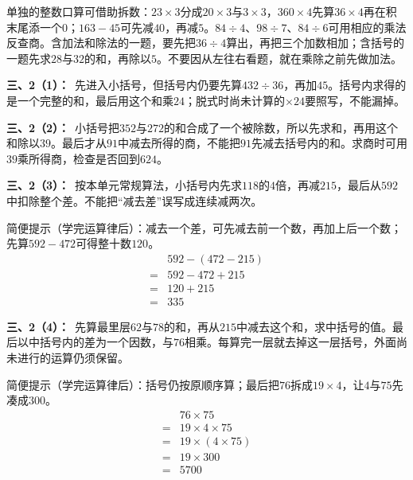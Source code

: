 \documentclass[multi=snippet,border=0pt]{standalone}
\newenvironment{snippet}[3]{\begin{minipage}{#1bp}\color{answerred}\fontsize{#2}{#3}\selectfont\raggedright}{\end{minipage}}
\begin{document}
\begin{snippet}{505}{11.5}{14}单独的整数口算可借助拆数：\(23\times3\)分成\(20\times3\)与\(3\times3\)，\(360\times4\)先算\(36\times4\)再在积末尾添一个\(0\)；\(163-45\)可先减\(40\)，再减\(5\)。\(84\div4\)、\(98\div7\)、\(84\div6\)可用相应的乘法反查商。含加法和除法的一题，要先把\(36\div4\)算出，再把三个加数相加；含括号的一题先求\(28\)与\(32\)的和，再除以\(5\)。不要因从左往右看题，就在乘除之前先做加法。\end{snippet}
\begin{snippet}{505}{11.5}{14}\textbf{三、2（1）：}\ 先进入小括号，但括号内仍要先算\(432\div36\)，再加\(45\)。括号内求得的是一个完整的和，最后用这个和乘\(24\)；脱式时尚未计算的\(\times24\)要照写，不能漏掉。\end{snippet}
\begin{snippet}{505}{11.5}{14}\textbf{三、2（2）：}\ 小括号把\(352\)与\(272\)的和合成了一个被除数，所以先求和，再用这个和除以\(39\)。最后才从\(91\)中减去所得的商，不能把\(91\)先减去括号内的和。求商时可用\(39\)乘所得商，检查是否回到\(624\)。\end{snippet}
\begin{snippet}{505}{11.5}{14}\textbf{三、2（3）：}\ 按本单元常规算法，小括号内先求\(118\)的\(4\)倍，再减\(215\)，最后从\(592\)中扣除整个差。不能把“减去差”误写成连续减两次。\par 简便提示（学完运算律后）：减去一个差，可先减去前一个数，再加上后一个数；先算\(592-472\)可得整十数\(120\)。\[\begin{aligned}&592-(472-215)\\={}&592-472+215\\={}&120+215\\={}&335\end{aligned}\]\end{snippet}
\begin{snippet}{505}{11.5}{14}\textbf{三、2（4）：}\ 先算最里层\(62\)与\(78\)的和，再从\(215\)中减去这个和，求中括号的值。最后以中括号内的差为一个因数，与\(76\)相乘。每算完一层就去掉这一层括号，外面尚未进行的运算仍须保留。\par 简便提示（学完运算律后）：括号仍按原顺序算；最后把\(76\)拆成\(19\times4\)，让\(4\)与\(75\)先凑成\(300\)。\[\begin{aligned}&76\times75\\={}&19\times4\times75\\={}&19\times(4\times75)\\={}&19\times300\\={}&5700\end{aligned}\]\end{snippet}
\end{document}
